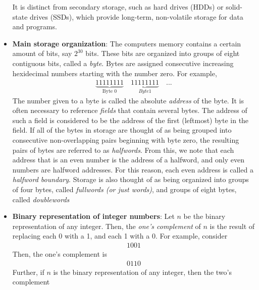 \documentclass{report}
\begin{document}
\begin{itemize}
\begin{itemize}
            \end{itemize}
            It is distinct from secondary storage, such as hard drives (HDDs) or solid-state drives (SSDs), which provide long-term, non-volatile storage for data and programs.
        \item \textbf{Main storage organization}: The computers memory contains a certain amount of bits, say $2^{30}$ bits. These bits are organized into groups of eight contiguous bits, called a \textit{byte}. Bytes are assigned consecutive increasing hexidecimal numbers starting with the number zero. For example,
            \begin{align*}
                \underbrace{11111111}_{\text{Byte 0}} \quad \underbrace{11111111}_{Byte 1} \quad ...
            \end{align*}
            The number given to a byte is called the absolute \textit{address} of the byte. It is often necessary to reference \textit{fields} that contain several bytes. The address of such a field is considered to be the address of the first (leftmost) byte in the field.
            \bigbreak \noindent 
            If all of the bytes in storage are thought of as being grouped into consecutive non-overlapping pairs beginning with byte zero, the resulting pairs of bytes are referred to as \textit{halfwords}. From this, we note that each address that is an even number is the address of a halfword, and only even numbers are halfword addresses. For this reason, each even address is called a \textit{halfword boundary}.
            \bigbreak \noindent 
            Storage is also thought of as being organized into groups of four bytes, called \textit{fullwords (or just words)}, and groups of eight bytes, called \textit{doublewords}
        \item \textbf{Binary representation of integer numbers}: Let $n$ be the binary representation of any integer. Then, the \textit{one's complement} of $n$ is the result of replacing each 0 with a 1, and each 1 with a 0.  For example, consider
            \begin{align*}
                1001
            \end{align*}
            Then, the one's complement is
            \begin{align*}
                0110
            \end{align*}
            Further, if $n$ is the binary representation of any integer, then the two's complement










    \end{itemize}
\end{document}
